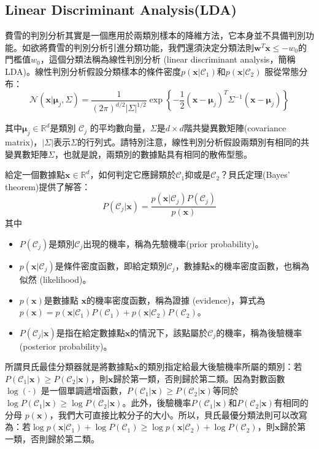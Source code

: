 \documentclass[12pt, a4paper]{article}
\begin{document}
 
\subsection{Linear Discriminant Analysis(LDA)}
費雪的判別分析其實是一個應用於兩類別樣本的降維方法，它本身並不具備判別功能。如欲將費雪的判別分析引進分類功能，我們還須決定分類法則$\mathbf{w}^T\mathbf{x}\le -w_0$的門檻值$w_0$，這個分類法稱為線性判別分析 (linear discriminant analysis，簡稱LDA)。線性判別分析假設分類樣本的條件密度$p(\mathbf{x}\vert \mathcal{C}_1)$和$p(\mathbf{x}\vert\mathcal{C}_2)$ 服從常態分布：
$$\displaystyle  \mathcal{N}(\mathbf{x}\vert\boldsymbol{\mu}_j,\Sigma)=\frac{1}{(2\pi)^{d/2}\vert\Sigma\vert^{1/2}}\exp\left\{-\frac{1}{2}(\mathbf{x}-\boldsymbol{\mu}_j)^T\Sigma^{-1}(\mathbf{x}-\boldsymbol{\mu}_j)\right\}$$

其中$\boldsymbol{\mu}_j\in\mathbb{R}^d$是類別 $\mathcal{C}_j$ 的平均數向量，$\Sigma$是$d\times d$階共變異數矩陣(covariance matrix)，$\vert\Sigma\vert$表示$\Sigma$的行列式。請特別注意，線性判別分析假設兩類別有相同的共變異數矩陣$\Sigma$，也就是說，兩類別的數據點具有相同的散佈型態。

給定一個數據點$\mathbf{x}\in\mathbb{R}^d$，如何判定它應歸類於$\mathcal{C}_1$抑或是$\mathcal{C}_2$？貝氏定理(Bayes’ theorem)提供了解答：
$$\displaystyle  P(\mathcal{C}_j\vert\mathbf{x})=\frac{p(\mathbf{x}\vert\mathcal{C}_j)P(\mathcal{C}_j)}{p(\mathbf{x})}$$
其中
\begin{itemize}
\item $P(\mathcal{C}_j)$是類別$\mathcal{C}_j$出現的機率，稱為先驗機率(prior probability)。
\item $p(\mathbf{x}\vert\mathcal{C}_j)$是條件密度函數，即給定類別$\mathcal{C}_j$，數據點$\mathbf{x}$的機率密度函數，也稱為似然 (likelihood)。
\item $p(\mathbf{x})$是數據點 $\mathbf{x}$的機率密度函數，稱為證據 (evidence)，算式為
$p(\mathbf{x})=p(\mathbf{x}\vert\mathcal{C}_1)P(\mathcal{C}_1)+p(\mathbf{x}\vert\mathcal{C}_2)P(\mathcal{C}_2)$。

\item $P(\mathcal{C}_j\vert\mathbf{x})$是指在給定數據點$\mathbf{x}$的情況下，該點屬於$\mathcal{C}_j$的機率，稱為後驗機率 (posterior probability)。
\end{itemize}

所謂貝氏最佳分類器就是將數據點$\mathbf{x}$的類別指定給最大後驗機率所屬的類別：若$P(\mathcal{C}_1\vert\mathbf{x})\ge P(\mathcal{C}_2\vert\mathbf{x})$，則$\mathbf{x}$歸於第一類，否則歸於第二類。因為對數函數$\log (\cdot)$ 是一個單調遞增函數，$P(\mathcal{C}_1\vert\mathbf{x})\ge P(\mathcal{C}_2\vert\mathbf{x})$等同於$\log P(\mathcal{C}_1\vert\mathbf{x})\ge \log P(\mathcal{C}_2\vert\mathbf{x})$。此外，後驗機率$P(\mathcal{C}_1\vert\mathbf{x})$和$P(\mathcal{C}_2\vert\mathbf{x})$有相同的分母 $p(\mathbf{x})$，我們大可直接比較分子的大小。所以，貝氏最優分類法則可以改寫為：若$\log p(\mathbf{x}\vert\mathcal{C}_1)+\log P(\mathcal{C}_1)\ge \log p(\mathbf{x}\vert\mathcal{C}_2)+\log P(\mathcal{C}_2)$，則$\mathbf{x}$歸於第一類，否則歸於第二類。
\end{document}
